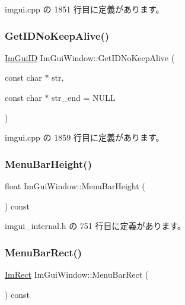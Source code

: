  imgui.\+cpp の 1851 行目に定義があります。

\mbox{\label{struct_im_gui_window_adc0a43f74a0b53a15a4bc4fea05524fe}} 
\subsubsection{\texorpdfstring{Get\+I\+D\+No\+Keep\+Alive()}{GetIDNoKeepAlive()}}
{\footnotesize\ttfamily \mbox{\hyperlink{imgui_8h_a1785c9b6f4e16406764a85f32582236f}{Im\+Gui\+ID}} Im\+Gui\+Window\+::\+Get\+I\+D\+No\+Keep\+Alive (\begin{DoxyParamCaption}\item[{const char $\ast$}]{str,  }\item[{const char $\ast$}]{str\+\_\+end = {\ttfamily NULL} }\end{DoxyParamCaption})}



 imgui.\+cpp の 1859 行目に定義があります。

\mbox{\label{struct_im_gui_window_acfb8bdad2e3ea6102589813ae32d0364}} 
\subsubsection{\texorpdfstring{Menu\+Bar\+Height()}{MenuBarHeight()}}
{\footnotesize\ttfamily float Im\+Gui\+Window\+::\+Menu\+Bar\+Height (\begin{DoxyParamCaption}{ }\end{DoxyParamCaption}) const\hspace{0.3cm}{\ttfamily [inline]}}



 imgui\+\_\+internal.\+h の 751 行目に定義があります。

\mbox{\label{struct_im_gui_window_a59df76c1445aaaf0b43456c83c1a88e5}} 
\subsubsection{\texorpdfstring{Menu\+Bar\+Rect()}{MenuBarRect()}}
{\footnotesize\ttfamily \mbox{\hyperlink{struct_im_rect}{Im\+Rect}} Im\+Gui\+Window\+::\+Menu\+Bar\+Rect (\begin{DoxyParamCaption}{ }\end{DoxyParamCaption}) const\hspace{0.3cm}{\ttfamily [inline]}}



